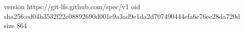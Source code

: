 version https://git-lfs.github.com/spec/v1
oid sha256:ed04b3532f22c08892690d001e9a3ad9e1da2d707490444efa6e76ec28da720d
size 864
